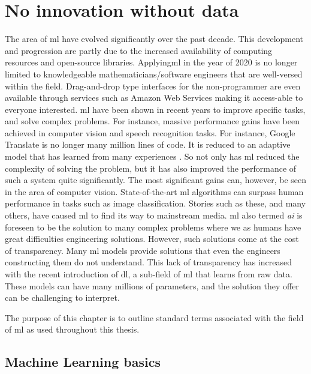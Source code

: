 \chapter{No innovation without data}\label{ch:mlbasics}

The area of \gls{ml} have evolved significantly over the past decade. This development and progression are partly due to the increased availability of computing resources and open-source libraries. Applying\gls{ml} in the year of 2020 is no longer limited to knowledgeable mathematicians/software engineers that are well-versed within the field. Drag-and-drop type interfaces for the non-programmer are even available through services such as Amazon Web Services making it access-able to everyone interested. \gls{ml} have been shown in recent years to improve specific tasks, and solve complex problems. For instance, massive performance gains have been achieved in computer vision and speech recognition tasks. For instance, Google Translate is no longer many million lines of code. It is reduced to an adaptive model that has learned from many experiences \cite{Wu2016GooglesTranslation}. So not only has \gls{ml} reduced the complexity of solving the problem, but it has also improved the performance of such a system quite significantly. The most significant gains can, however, be seen in the area of computer vision. State-of-the-art \gls{ml} algorithms can surpass human performance in tasks such as image classification. Stories such as these, and many others, have caused \gls{ml} to find its way to mainstream media. \gls{ml} also termed \emph{\gls{ai}} is foreseen to be the solution to many complex problems where we as humans have great difficulties engineering solutions. However, such solutions come at the cost of transparency. Many \gls{ml} models provide solutions that even the engineers constructing them do not understand. This lack of transparency has increased with the recent introduction of \gls{dl}, a sub-field of \gls{ml} that learns from raw data. These models can have many millions of parameters, and the solution they offer can be challenging to interpret. 

The purpose of this chapter is to outline standard terms associated with the field of \gls{ml} as used throughout this thesis.



\section{Machine Learning basics}


